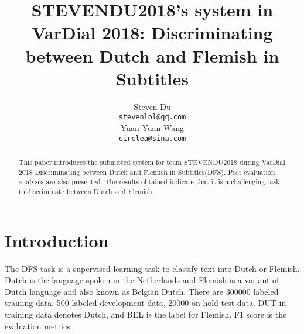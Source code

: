 \documentclass[11pt]{article}
\title{STEVENDU2018's system in VarDial 2018: Discriminating between Dutch and Flemish in Subtitles}
\author{Steven Du \\
	{\tt\footnotesize  stevenlol@qq.com} \\
	\And
	Yuan Yuan Wang \\
	{\tt\footnotesize  circlea@sina.com} 
	}
\date{}
\begin{document}
\maketitle


\begin{abstract}
  This paper introduces the submitted system for team STEVENDU2018 during VarDial 2018 Discriminating between Dutch and Flemish in Subtitles(DFS). Post evaluation analyses are also presented. The results obtained indicate that it is a challenging task to discriminate between Dutch and Flemish.
\end{abstract}


\section{Introduction}
\label{intro}

%
% 
The DFS task
is a supervised learning task to classify text into Dutch or Flemish. Dutch is the language spoken in the Netherlands and Flemish is a variant of Dutch language and also known as Belgian Dutch. There are 300000 labeled training data, 500 labeled development data, 20000 on-hold test data. DUT in training data denotes Dutch, and BEL is the label for Flemish. F1 score is the evaluation metrics.  %
\end{document}
